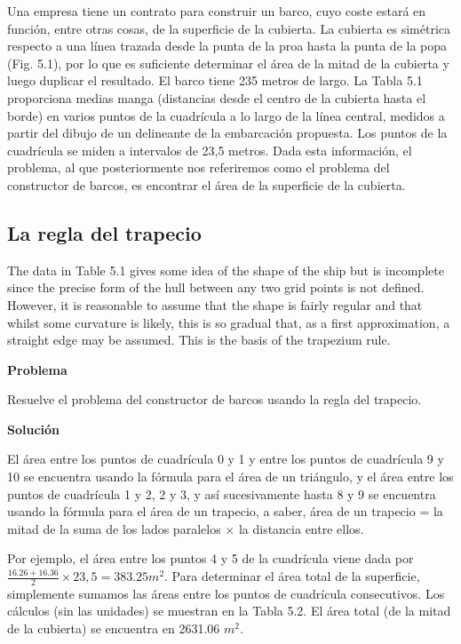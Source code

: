 \documentclass[12pt, letterpaper, twoside]{article}
\begin{document}
Una empresa tiene un contrato para construir un barco, cuyo coste estará en función, entre otras cosas, de la superficie de la cubierta. La cubierta es simétrica respecto a una línea trazada desde la punta de la proa hasta la punta de la popa (Fig. 5.1), por lo que es suficiente determinar el área de la mitad de la cubierta y luego duplicar el resultado. El barco tiene 235 metros de largo. La Tabla 5.1 proporciona medias manga (distancias desde el centro de la cubierta hasta el borde) en varios puntos de la cuadrícula a lo largo de la línea central, medidos a partir del dibujo de un delineante de la embarcación propuesta. Los puntos de la cuadrícula se miden a intervalos de 23,5 metros. Dada esta información, el problema, al que posteriormente nos referiremos como el problema del constructor de barcos, es encontrar el área de la superficie de la cubierta.


\subsection{La regla del trapecio}

The data in Table 5.1 gives some idea of the shape of the ship but is incomplete since the precise form of the hull between any two grid points is not defined. However, it is reasonable to assume that the shape is fairly regular and that whilst some curvature is likely, this is so gradual that, as a first approximation, a straight edge may be assumed. This is the basis of the trapezium rule.

\hfill

\textbf{Problema}

\hfill

Resuelve el problema del constructor de barcos usando la regla del trapecio.

\hfill

\textbf{Solución}

\hfill


El área entre los puntos de cuadrícula 0 y 1 y entre los puntos de cuadrícula 9 y 10 se encuentra usando la fórmula para el área de un triángulo, 
y el área entre los puntos de cuadrícula 1 y 2, 2 y 3, y así sucesivamente hasta 8 y 9 se encuentra usando la fórmula para el área de un trapecio, 
a saber, área de un trapecio = la mitad de la suma de los lados paralelos $\times$ la distancia entre ellos. 

\hfill

Por ejemplo, el área entre los puntos 4 y 5 de la cuadrícula viene dada por $\frac{16.26+16.36}{2} \times 23,5 = 383.25 m^2$. 
Para determinar el área total de la superficie, simplemente sumamos las áreas entre los puntos de cuadrícula consecutivos. 
Los cálculos (sin las unidades) se muestran en la Tabla 5.2. El área total (de la mitad de la cubierta) se encuentra en 2631.06 $m^2$.
\end{document}
